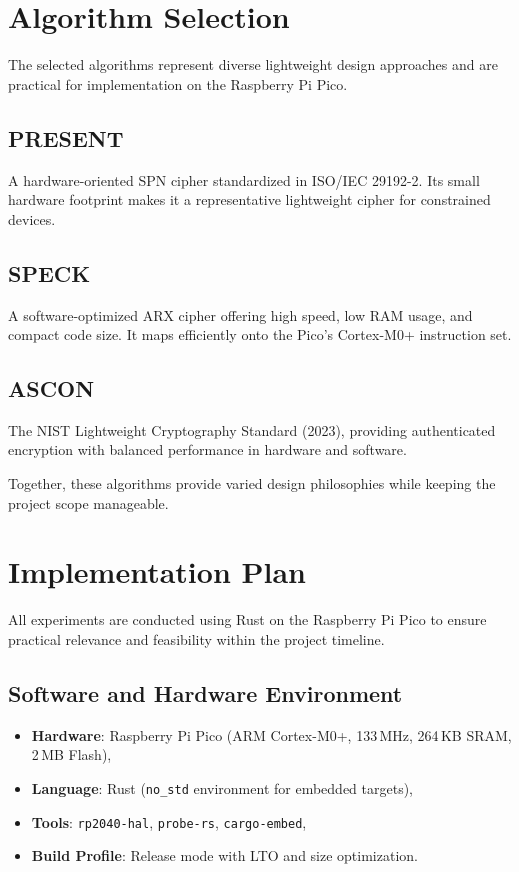 \documentclass[12pt]{report}
\begin{document}
\section{Algorithm Selection}

The selected algorithms represent diverse lightweight design approaches and are practical
for implementation on the Raspberry Pi Pico.

\subsection*{PRESENT}
A hardware-oriented SPN cipher standardized in ISO/IEC 29192-2. Its small hardware footprint
makes it a representative lightweight cipher for constrained devices.

\subsection*{SPECK}
A software-optimized ARX cipher offering high speed, low RAM usage, and compact code size.
It maps efficiently onto the Pico’s Cortex-M0+ instruction set.

\subsection*{ASCON}
The NIST Lightweight Cryptography Standard (2023), providing authenticated encryption with
balanced performance in hardware and software.

Together, these algorithms provide varied design philosophies while keeping the project scope manageable.

\section{Implementation Plan}

All experiments are conducted using Rust on the Raspberry Pi Pico to ensure practical
relevance and feasibility within the project timeline.

\subsection{Software and Hardware Environment}

\begin{itemize}
    \item \textbf{Hardware}: Raspberry Pi Pico (ARM Cortex-M0+, 133\,MHz, 264\,KB SRAM, 2\,MB Flash),
    \item \textbf{Language}: Rust (\texttt{no\_std} environment for embedded targets),
    \item \textbf{Tools}: \texttt{rp2040-hal}, \texttt{probe-rs}, \texttt{cargo-embed},
    \item \textbf{Build Profile}: Release mode with LTO and size optimization.
\end{itemize}
\end{document}
